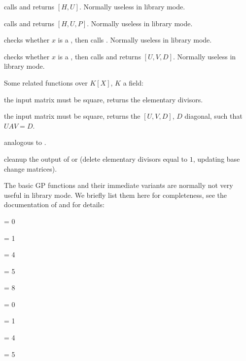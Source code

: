  calls  and returns $[H,
U]$. Normally useless in library mode.

 calls  and returns
$[H, U, P]$. Normally useless in library mode.

 checks whether $x$ is a , then calls
. Normally useless in library mode.

 checks whether $x$ is a , then calls
 and returns $[U,V,D]$. Normally useless in
library mode.

\noindent Some related functions over $K[X]$, $K$ a field:

 the input matrix must be square, returns the
elementary divisors.

 the input matrix must be square, returns the
$[U,V,D]$, $D$ diagonal, such that $UAV = D$.

 analogous to .

 cleanup the output of  or
 (delete elementary divisors equal to $1$, updating base
change matrices).


The basic GP functions and their immediate variants are normally not very
useful in library mode. We briefly list them here for completeness, see the
documentation of  and  for details:

\item {}

 \fl = 0

 \fl = 1

 \fl = 4

 \fl = 5

 \fl = 8

\item {}

 \fl = 0

 \fl = 1

 \fl = 4

 \fl = 5


